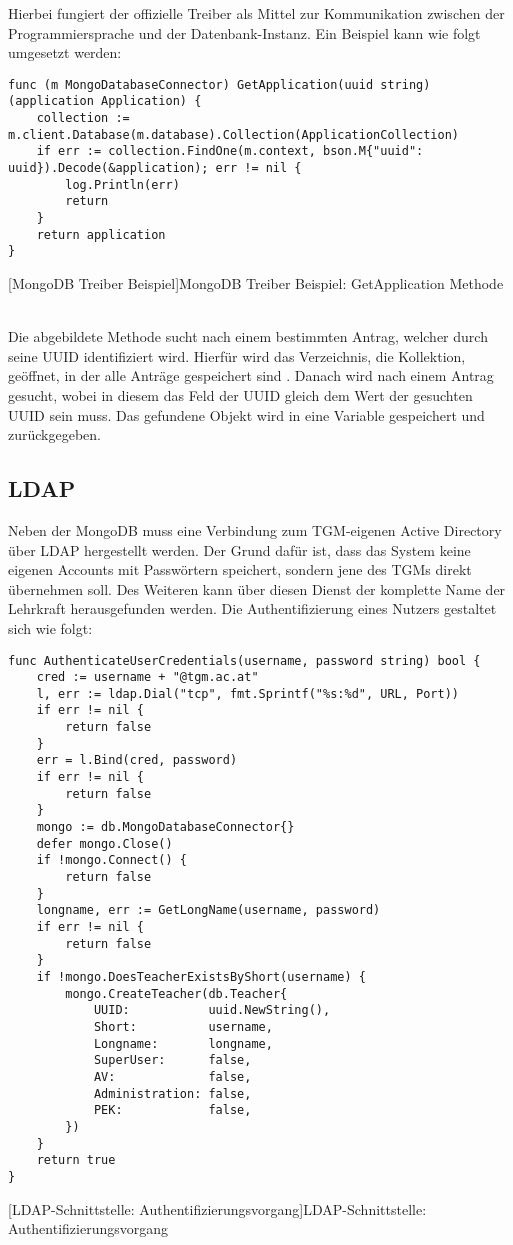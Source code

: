 \newpage

Hierbei fungiert der offizielle Treiber als Mittel zur Kommunikation zwischen der Programmiersprache und der Datenbank-Instanz. Ein Beispiel kann wie folgt umgesetzt werden:

\begin{verbatim}
func (m MongoDatabaseConnector) GetApplication(uuid string) (application Application) {
	collection := m.client.Database(m.database).Collection(ApplicationCollection)
	if err := collection.FindOne(m.context, bson.M{"uuid": uuid}).Decode(&application); err != nil {
		log.Println(err)
		return
	}
	return application
}
\end{verbatim}
[MongoDB Treiber Beispiel]{MongoDB Treiber Beispiel: GetApplication Methode}

~\\

Die abgebildete Methode sucht nach einem bestimmten Antrag, welcher durch seine UUID identifiziert wird. Hierfür wird das Verzeichnis, die Kollektion, geöffnet, in der alle Anträge gespeichert sind \cite{mongogo}. Danach wird nach einem Antrag gesucht, wobei in diesem das Feld der UUID gleich dem Wert der gesuchten UUID sein muss. Das gefundene Objekt wird in eine Variable gespeichert und zurückgegeben.

\newpage

\subsection{LDAP}

Neben der MongoDB muss eine Verbindung zum TGM-eigenen Active Directory über LDAP hergestellt werden. Der Grund dafür  ist, dass das System keine eigenen Accounts mit Passwörtern speichert, sondern jene des TGMs direkt übernehmen soll. Des Weiteren kann über diesen Dienst der komplette Name der Lehrkraft herausgefunden werden. Die Authentifizierung eines Nutzers gestaltet sich wie folgt:

\begin{verbatim}
func AuthenticateUserCredentials(username, password string) bool {
	cred := username + "@tgm.ac.at"
	l, err := ldap.Dial("tcp", fmt.Sprintf("%s:%d", URL, Port))
	if err != nil {
		return false
	}
	err = l.Bind(cred, password)
	if err != nil {
		return false
	}
	mongo := db.MongoDatabaseConnector{}
	defer mongo.Close()
	if !mongo.Connect() {
		return false
	}
	longname, err := GetLongName(username, password)
	if err != nil {
		return false
	}
	if !mongo.DoesTeacherExistsByShort(username) {
		mongo.CreateTeacher(db.Teacher{
			UUID:           uuid.NewString(),
			Short:          username,
			Longname:       longname,
			SuperUser:      false,
			AV:             false,
			Administration: false,
			PEK:            false,
		})
	}
	return true
}
\end{verbatim}
[LDAP-Schnittstelle: Authentifizierungsvorgang]{LDAP-Schnittstelle: Authentifizierungsvorgang \cite{go-ldap}}

